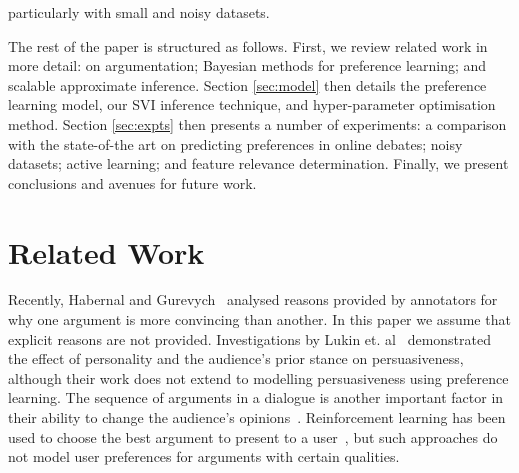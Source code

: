 particularly with small and noisy datasets. 

The rest of the paper is structured as follows.
First, we review related work in more detail: on argumentation; Bayesian methods for preference learning; and scalable approximate inference.
Section \ref{sec:model} then details the preference learning model, our SVI inference technique, and hyper-parameter optimisation method.
Section \ref{sec:expts} then presents a number of experiments: a comparison with the
state-of-the art on predicting preferences in online debates; 
noisy datasets; active learning; and feature relevance determination.
Finally, we present conclusions and avenues for future work.

\section{Related Work}\label{sec:related}

Recently, Habernal and Gurevych~ analysed reasons provided by annotators for why one argument is more convincing than another. In this paper we assume that explicit reasons are not provided. 
Investigations by Lukin et. al~ demonstrated the effect of personality and the audience's prior stance on persuasiveness,
although their work does not extend to modelling persuasiveness using preference learning.
The sequence of arguments in a dialogue is another important factor in their ability to change
the audience's opinions~\cite{tan2016winning}. Reinforcement learning has been used 
to choose the best argument to present to a user~\cite{rosenfeld2016providing,monteserin2013reinforcement},
but such approaches do not model user preferences for arguments with certain qualities.
 
